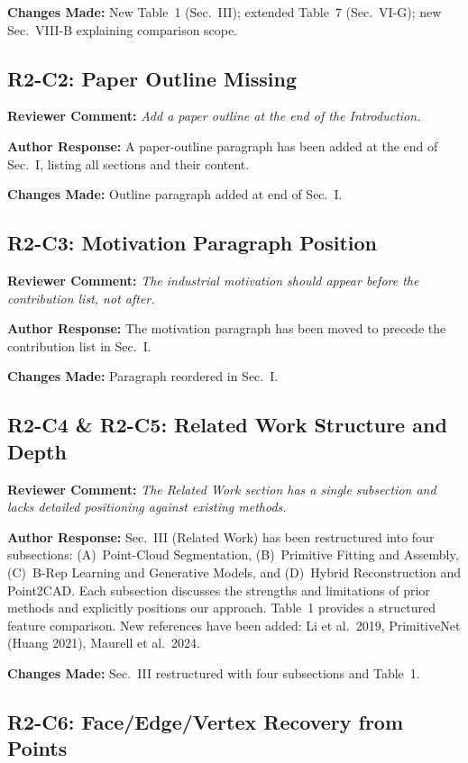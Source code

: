 \documentclass[11pt]{article}
\newcommand{\RC}[1]{\noindent\textcolor{revcolor}{\textbf{Reviewer Comment:} \emph{#1}}\par\medskip}
\newcommand{\AR}[1]{\noindent\textcolor{respcolor}{\textbf{Author Response:} #1}\par\medskip}
\newcommand{\CH}[1]{\noindent\textbf{Changes Made:} #1\par\bigskip}
\begin{document}
\CH{New Table~1 (Sec.~III); extended Table~7 (Sec.~VI-G);
new Sec.~VIII-B explaining comparison scope.}

\subsection*{R2-C2: Paper Outline Missing}

\RC{Add a paper outline at the end of the Introduction.}

\AR{A paper-outline paragraph has been added at the end of Sec.~I,
listing all sections and their content.}

\CH{Outline paragraph added at end of Sec.~I.}

\subsection*{R2-C3: Motivation Paragraph Position}

\RC{The industrial motivation should appear before the contribution
list, not after.}

\AR{The motivation paragraph has been moved to precede the
contribution list in Sec.~I.}

\CH{Paragraph reordered in Sec.~I.}

\subsection*{R2-C4 \& R2-C5: Related Work Structure and Depth}

\RC{The Related Work section has a single subsection and lacks
detailed positioning against existing methods.}

\AR{Sec.~III (Related Work) has been restructured into four
subsections: (A)~Point-Cloud Segmentation,
(B)~Primitive Fitting and Assembly, (C)~B-Rep Learning and
Generative Models, and (D)~Hybrid Reconstruction and Point2CAD.
Each subsection discusses the strengths and limitations of prior
methods and explicitly positions our approach.
Table~1 provides a structured feature comparison.
New references have been added: Li et al.\ 2019, PrimitiveNet
(Huang 2021), Maurell et al.\ 2024.}

\CH{Sec.~III restructured with four subsections and Table~1.}

\subsection*{R2-C6: Face/Edge/Vertex Recovery from Points}
\end{document}
